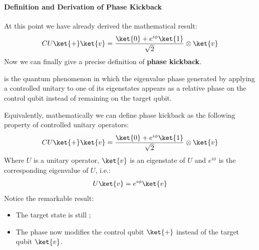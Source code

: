 \paragraph{Definition and Derivation of Phase Kickback}\label{ex:phase-kickback-definition-and-derivation}

At this point we have already derived the mathematical result:
\begin{equation*}
    CU \ket{+}\ket{v} = \frac{\ket{0} + e^{i\phi}\ket{1}}{\sqrt{2}} \otimes \ket{v}
\end{equation*}
Now we can finally give a precise definition of \textbf{phase kickback}.

\highspace
\begin{definitionbox}
     is the quantum phenomenon in which the eigenvalue phase generated by applying a controlled unitary to one of its eigenstates appears as a relative phase on the control qubit instead of remaining on the target qubit.

    \highspace
    Equivalently, mathematically we can define phase kickback as the following property of controlled unitary operators:
    \begin{equation}\label{eq:phase-kickback-definition}
        CU\ket{+}\ket{v} = \frac{\ket{0} + e^{i\phi}\ket{1}}{\sqrt{2}} \otimes \ket{v}
    \end{equation}
    Where $U$ is a unitary operator, $\ket{v}$ is an eigenstate of $U$ and $e^{i\phi}$ is the corresponding eigenvalue of $U$, i.e.:
    \begin{equation*}
        U\ket{v} = e^{i\phi}\ket{v}
    \end{equation*}
    Notice the remarkable result:
    \begin{itemize}
        \item The target state is still ;
        \item The phase now modifies the control qubit $\ket{+}$ instead of the target qubit $\ket{v}$.
    \end{itemize}


\end{definitionbox}
